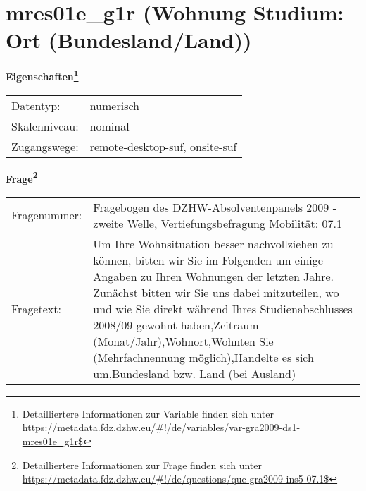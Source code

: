 
    \setcounter{footnote}{0}

    \vspace*{-1.8cm}
	\section{mres01e\_g1r (Wohnung Studium: Ort (Bundesland/Land))}
	\label{section:mres01e_g1r}



    \vspace*{0.5cm}
    \noindent\textbf{Eigenschaften\footnote{Detailliertere Informationen zur Variable finden sich unter
		\url{https://metadata.fdz.dzhw.eu/\#!/de/variables/var-gra2009-ds1-mres01e_g1r$}}}\\
	\begin{tabularx}{\hsize}{@{}lX}
	Datentyp: & numerisch \\
	Skalenniveau: & nominal \\
	Zugangswege: &
	  remote-desktop-suf, 
	  onsite-suf
 \\
    \end{tabularx}



				\vspace*{0.5cm}
                \noindent\textbf{Frage\footnote{Detailliertere Informationen zur Frage finden sich unter
		              \url{https://metadata.fdz.dzhw.eu/\#!/de/questions/que-gra2009-ins5-07.1$}}}\\
				\begin{tabularx}{\hsize}{@{}lX}
					Fragenummer: &
					  Fragebogen des DZHW-Absolventenpanels 2009 - zweite Welle, Vertiefungsbefragung Mobilität:
					  07.1
 \\
					Fragetext: & Um Ihre Wohnsituation besser nachvollziehen zu können, bitten wir Sie im Folgenden um einige Angaben zu Ihren Wohnungen der letzten Jahre. Zunächst bitten wir Sie uns dabei mitzuteilen, wo und wie Sie direkt während Ihres Studienabschlusses 2008/09 gewohnt haben,Zeitraum (Monat/Jahr),Wohnort,Wohnten Sie (Mehrfachnennung möglich),Handelte es sich um,Bundesland bzw. Land (bei Ausland) \\
				\end{tabularx}





